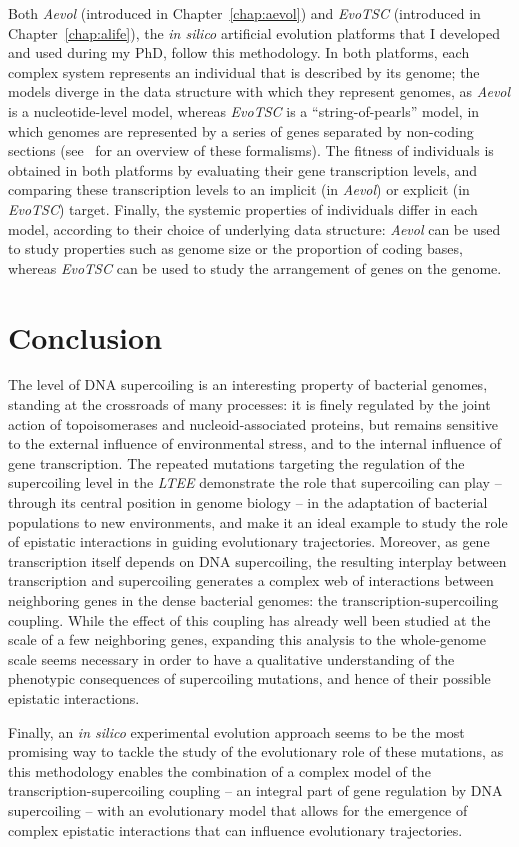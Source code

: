 Both \emph{Aevol} (introduced in Chapter~\ref{chap:aevol}) and \emph{EvoTSC} (introduced in Chapter~\ref{chap:alife}), the \emph{in silico} artificial evolution platforms that I developed and used during my PhD, follow this methodology.
In both platforms, each complex system represents an individual that is described by its genome; the models diverge in the data structure with which they represent genomes, as \emph{Aevol} is a nucleotide-level model, whereas \emph{EvoTSC} is a ``string-of-pearls'' model, in which genomes are represented by a series of genes separated by non-coding sections (see~\cite{hindre2012} for an overview of these formalisms).
The fitness of individuals is obtained in both platforms by evaluating their gene transcription levels, and comparing these transcription levels to an implicit (in \emph{Aevol}) or explicit (in \emph{EvoTSC}) target.
Finally, the systemic properties of individuals differ in each model, according to their choice of underlying data structure: \emph{Aevol} can be used to study properties such as genome size or the proportion of coding bases, whereas \emph{EvoTSC} can be used to study the arrangement of genes on the genome.


\section{Conclusion}

The level of DNA supercoiling is an interesting property of bacterial genomes, standing at the crossroads of many processes: it is finely regulated by the joint action of topoisomerases and nucleoid-associated proteins, but remains sensitive to the external influence of environmental stress, and to the internal influence of gene transcription.
The repeated mutations targeting the regulation of the supercoiling level in the \emph{LTEE} demonstrate the role that supercoiling can play -- through its central position in genome biology -- in the adaptation of bacterial populations to new environments, and make it an ideal example to study the role of epistatic interactions in guiding evolutionary trajectories.
Moreover, as gene transcription itself depends on DNA supercoiling, the resulting interplay between transcription and supercoiling generates a complex web of interactions between neighboring genes in the dense bacterial genomes: the transcription-supercoiling coupling.
While the effect of this coupling has already well been studied at the scale of a few neighboring genes, expanding this analysis to the whole-genome scale seems necessary in order to have a qualitative understanding of the phenotypic consequences of supercoiling mutations, and hence of their possible epistatic interactions.

Finally, an \emph{in silico} experimental evolution approach seems to be the most promising way to tackle the study of the evolutionary role of these mutations, as this methodology enables the combination of a complex model of the transcription-supercoiling coupling -- an integral part of gene regulation by DNA supercoiling -- with an evolutionary model that allows for the emergence of complex epistatic interactions that can influence evolutionary trajectories.
